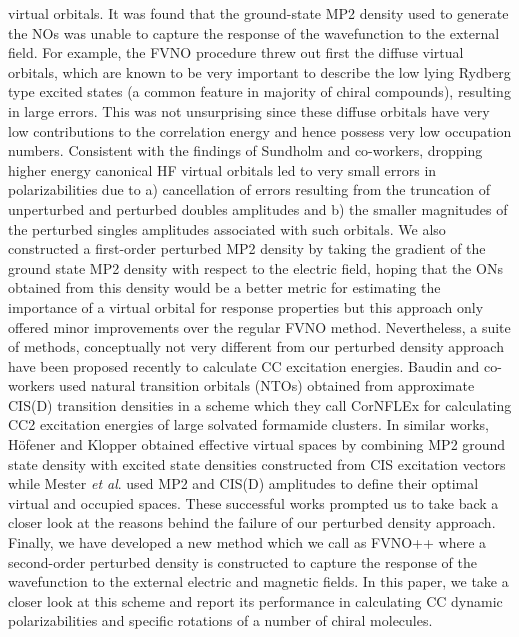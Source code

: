 virtual orbitals. It was found that the ground-state MP2 density used to 
generate the NOs was unable to capture the response of the wavefunction to the 
external field. For example, the FVNO procedure threw out first the 
diffuse virtual orbitals, which are known to be very important to describe 
the low lying Rydberg type excited states (a common feature in majority of 
chiral compounds), resulting in large errors. This was not unsurprising 
since these diffuse orbitals have very low contributions to the correlation 
energy and hence possess very low occupation numbers. Consistent with the findings of Sundholm and co-workers\cite{Sundholm11}, dropping higher energy canonical HF virtual orbitals led to very small errors in polarizabilities due
to a) cancellation of errors resulting from the truncation of unperturbed 
and perturbed doubles amplitudes and b) the smaller magnitudes of the perturbed
singles amplitudes associated with such orbitals. We also constructed a 
first-order perturbed MP2 density by taking the gradient of the
ground state MP2 density with respect to the electric field, 
hoping that the ONs obtained from this density would be a better metric for 
estimating the importance of a virtual orbital for response properties 
but this approach only offered minor improvements over the regular 
FVNO method. Nevertheless, a suite of methods, conceptually not very 
different from our perturbed density approach have been proposed recently 
to calculate CC excitation energies. Baudin and co-workers used natural 
transition orbitals (NTOs) obtained from approximate CIS(D) transition 
densities in a scheme which they call CorNFLEx for calculating CC2 excitation 
energies of large solvated formamide clusters\cite{Baudin17}. In similar works, 
H{\"o}fener and Klopper obtained effective virtual spaces by combining MP2 
ground state density with excited state densities constructed from CIS 
excitation vectors\cite{HofenerKlopper17} while Mester {\em et al}. 
used MP2 and CIS(D) amplitudes to define their optimal virtual and occupied spaces\cite{Mester17,Mester18}. These successful works prompted us to take 
back a closer look at the reasons behind the failure of our perturbed 
density approach. Finally, we have developed a new method which we call 
as FVNO++ where a second-order perturbed density is constructed to capture the 
response of the wavefunction to the external electric and magnetic fields. 
In this paper, we take a closer look at this scheme and report its performance 
in calculating CC dynamic polarizabilities and specific rotations of a number 
of chiral molecules.
